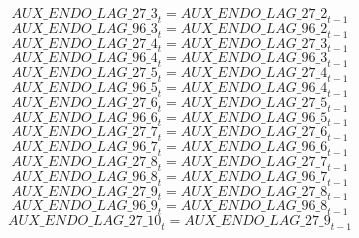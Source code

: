 \begin{dmath}
{AUX\_ENDO\_LAG\_27\_3}_{t}={AUX\_ENDO\_LAG\_27\_2}_{t-1}
\end{dmath}
\begin{dmath}
{AUX\_ENDO\_LAG\_96\_3}_{t}={AUX\_ENDO\_LAG\_96\_2}_{t-1}
\end{dmath}
\begin{dmath}
{AUX\_ENDO\_LAG\_27\_4}_{t}={AUX\_ENDO\_LAG\_27\_3}_{t-1}
\end{dmath}
\begin{dmath}
{AUX\_ENDO\_LAG\_96\_4}_{t}={AUX\_ENDO\_LAG\_96\_3}_{t-1}
\end{dmath}
\begin{dmath}
{AUX\_ENDO\_LAG\_27\_5}_{t}={AUX\_ENDO\_LAG\_27\_4}_{t-1}
\end{dmath}
\begin{dmath}
{AUX\_ENDO\_LAG\_96\_5}_{t}={AUX\_ENDO\_LAG\_96\_4}_{t-1}
\end{dmath}
\begin{dmath}
{AUX\_ENDO\_LAG\_27\_6}_{t}={AUX\_ENDO\_LAG\_27\_5}_{t-1}
\end{dmath}
\begin{dmath}
{AUX\_ENDO\_LAG\_96\_6}_{t}={AUX\_ENDO\_LAG\_96\_5}_{t-1}
\end{dmath}
\begin{dmath}
{AUX\_ENDO\_LAG\_27\_7}_{t}={AUX\_ENDO\_LAG\_27\_6}_{t-1}
\end{dmath}
\begin{dmath}
{AUX\_ENDO\_LAG\_96\_7}_{t}={AUX\_ENDO\_LAG\_96\_6}_{t-1}
\end{dmath}
\begin{dmath}
{AUX\_ENDO\_LAG\_27\_8}_{t}={AUX\_ENDO\_LAG\_27\_7}_{t-1}
\end{dmath}
\begin{dmath}
{AUX\_ENDO\_LAG\_96\_8}_{t}={AUX\_ENDO\_LAG\_96\_7}_{t-1}
\end{dmath}
\begin{dmath}
{AUX\_ENDO\_LAG\_27\_9}_{t}={AUX\_ENDO\_LAG\_27\_8}_{t-1}
\end{dmath}
\begin{dmath}
{AUX\_ENDO\_LAG\_96\_9}_{t}={AUX\_ENDO\_LAG\_96\_8}_{t-1}
\end{dmath}
\begin{dmath}
{AUX\_ENDO\_LAG\_27\_10}_{t}={AUX\_ENDO\_LAG\_27\_9}_{t-1}
\end{dmath}
